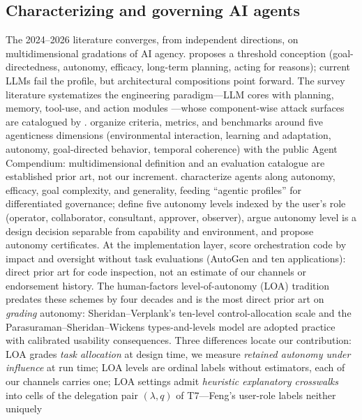\subsection{Characterizing and governing AI agents}\label{rw:ai-agents}

The 2024--2026 literature converges, from independent directions, on
multidimensional gradations of AI agency. \citet{dung2024} proposes a
threshold conception (goal-directedness, autonomy, efficacy, long-term
planning, acting for reasons); current LLMs fail the profile, but
architectural compositions \citep[e.g.][]{park2023} point forward. The survey
literature systematizes the engineering paradigm---LLM cores with planning,
memory, tool-use, and action modules \citep{wang2023,xi2023}---whose
component-wise attack surfaces are catalogued by \citet{su2025}.
\citet{lassiter2026compendium} organize criteria, metrics, and benchmarks
around five agenticness dimensions (environmental interaction, learning and
adaptation, autonomy, goal-directed behavior, temporal coherence) with the
public Agent Compendium: multidimensional definition and an evaluation
catalogue are established prior art, not our increment.
\citet{kasirzadeh2025} characterize agents along autonomy, efficacy, goal
complexity, and generality, feeding ``agentic profiles'' for differentiated
governance; \citet{feng2025} define five autonomy levels indexed by the user's
role (operator, collaborator, consultant, approver, observer), argue autonomy
level is a design decision separable from capability and environment, and
propose autonomy certificates. At the implementation layer, \citet{cihon2025}
score orchestration code by impact and oversight without task evaluations
(AutoGen and ten applications): direct prior art for code inspection, not an
estimate of our channels or endorsement history. The human-factors
level-of-autonomy (LOA) tradition predates these schemes by four decades and is
the most direct prior art on \emph{grading} autonomy: Sheridan--Verplank's
ten-level control-allocation scale \citep{sheridan1978} and the
Parasuraman--Sheridan--Wickens types-and-levels model \citep{parasuraman2000}
are adopted practice with calibrated usability consequences. Three differences
locate our contribution: LOA grades \emph{task allocation} at design time, we
measure \emph{retained autonomy under influence} at run time; LOA levels are
ordinal labels without estimators, each of our channels carries one; LOA
settings admit \emph{heuristic explanatory crosswalks} into cells of the
delegation pair $(\lambda,q)$ of T7---Feng's user-role labels neither uniquely
